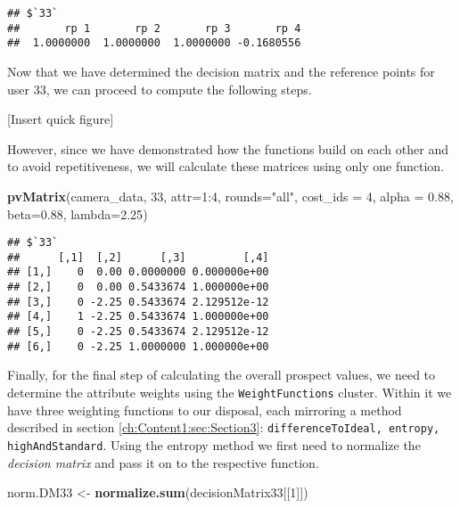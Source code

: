 \documentclass[]{article}
\newenvironment{Shaded}{\begin{snugshade}}{\end{snugshade}}
\newcommand{\KeywordTok}[1]{\textcolor[rgb]{0.13,0.29,0.53}{\textbf{{#1}}}}
\newcommand{\DataTypeTok}[1]{\textcolor[rgb]{0.13,0.29,0.53}{{#1}}}
\newcommand{\DecValTok}[1]{\textcolor[rgb]{0.00,0.00,0.81}{{#1}}}
\newcommand{\FloatTok}[1]{\textcolor[rgb]{0.00,0.00,0.81}{{#1}}}
\newcommand{\StringTok}[1]{\textcolor[rgb]{0.31,0.60,0.02}{{#1}}}
\newcommand{\NormalTok}[1]{{#1}}
\begin{document}
\begin{verbatim}
## $`33`
##       rp 1       rp 2       rp 3       rp 4 
##  1.0000000  1.0000000  1.0000000 -0.1680556
\end{verbatim}

Now that we have determined the decision matrix and the reference points
for user 33, we can proceed to compute the following steps.

{[}Insert quick figure{]}

However, since we have demonstrated how the functions build on each
other and to avoid repetitiveness, we will calculate these matrices
using only one function.

\begin{Shaded}
\begin{Highlighting}[]
\KeywordTok{pvMatrix}\NormalTok{(camera_data, }\DecValTok{33}\NormalTok{, }\DataTypeTok{attr=}\DecValTok{1}\NormalTok{:}\DecValTok{4}\NormalTok{, }\DataTypeTok{rounds=}\StringTok{"all"}\NormalTok{, }\DataTypeTok{cost_ids =} \DecValTok{4}\NormalTok{,}
         \DataTypeTok{alpha =} \FloatTok{0.88}\NormalTok{, }\DataTypeTok{beta=}\FloatTok{0.88}\NormalTok{, }\DataTypeTok{lambda=}\FloatTok{2.25}\NormalTok{)}
\end{Highlighting}
\end{Shaded}

\begin{verbatim}
## $`33`
##      [,1]  [,2]      [,3]         [,4]
## [1,]    0  0.00 0.0000000 0.000000e+00
## [2,]    0  0.00 0.5433674 1.000000e+00
## [3,]    0 -2.25 0.5433674 2.129512e-12
## [4,]    1 -2.25 0.5433674 1.000000e+00
## [5,]    0 -2.25 0.5433674 2.129512e-12
## [6,]    0 -2.25 1.0000000 1.000000e+00
\end{verbatim}

Finally, for the final step of calculating the overall prospect values,
we need to determine the attribute weights using the
\texttt{WeightFunctions} cluster. Within it we have three weighting
functions to our disposal, each mirroring a method described in section
\ref{ch:Content1:sec:Section3}:
\texttt{differenceToIdeal, entropy, highAndStandard}. Using the entropy
method we first need to normalize the \emph{decision matrix} and pass it
on to the respective function.

\begin{Shaded}
\begin{Highlighting}[]
\NormalTok{norm.DM33 <-}\StringTok{ }\KeywordTok{normalize.sum}\NormalTok{(decisionMatrix33[[}\DecValTok{1}\NormalTok{]])}
\end{Highlighting}
\end{Shaded}
\end{document}
